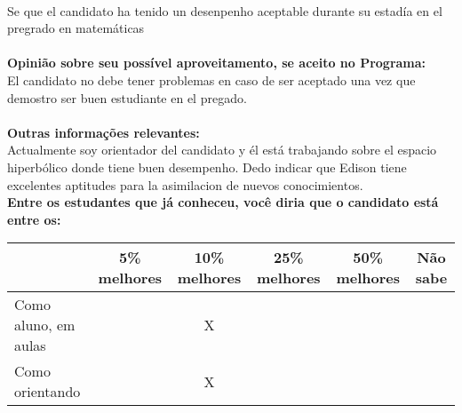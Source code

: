 \documentclass[11pt]{article}
\begin{document}
\\Se que el candidato ha tenido un desenpenho aceptable durante su estadía en el pregrado en matemáticas\\
\\
\textbf{Opinião sobre seu possível aproveitamento, se aceito no Programa:}
\\El candidato no debe tener problemas en caso de ser aceptado una vez que demostro ser buen estudiante en el pregado. \\ 
\\
\textbf{Outras informações relevantes:} \\Actualmente soy orientador del candidato y él está trabajando sobre el espacio hiperbólico donde tiene buen desempenho.
Dedo indicar que Edison tiene excelentes aptitudes para la asimilacion de nuevos conocimientos.
\\[0.3cm]
\textbf{Entre os estudantes que já conheceu, você diria que o candidato está entre os:}
\\
\begin{tabular}{|l|c|c|c|c|c|}
\hline
 & 5\% melhores & 10\% melhores & 25\% melhores & 50\% melhores & Não sabe \\
\hline
Como aluno, em aulas &  & X &  &  & \\
\hline
Como orientando &  & X &  &  & \\
\hline
\end{tabular}
\end{document}
